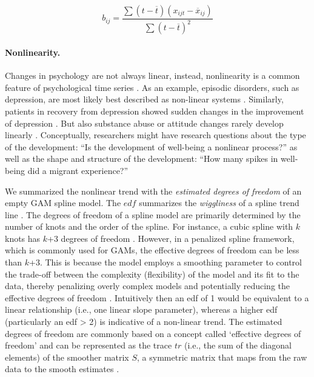 \begin{equation} \label{eq:lin}
  b_{ij} = \frac{\sum(t-\overline{t})(x_{ijt}-\overline{x}_{ij})}{\sum(t-\overline{t})^2}
\end{equation}

\paragraph{Nonlinearity.}

Changes in psychology are not always linear, instead, nonlinearity is a
common feature of psychological time series \citep{hayes2007}. As an
example, episodic disorders, such as depression, are most likely best
described as non-linear systems \citep{hosenfeld2015}. Similarly,
patients in recovery from depression showed sudden changes in the
improvement of depression \citep{helmich2020a}. But also substance abuse
\citep{boker1998} or attitude changes rarely develop linearly
\citep{vandermaas2003}. Conceptually, researchers might have research
questions about the type of the development: ``Is the development of
well-being a nonlinear process?'' as well as the shape and structure of
the development: ``How many spikes in well-being did a migrant
experience?''

We summarized the nonlinear trend with the
\textit{estimated degrees of freedom} of an empty GAM spline model. The
\(edf\) summarizes the \textit{wiggliness} of a spline trend line
\citep{wood2017}. The degrees of freedom of a spline model are primarily
determined by the number of knots and the order of the spline. For
instance, a cubic spline with \(k\) knots has \(k\)+3 degrees of freedom
\citep{faraway2016}. However, in a penalized spline framework, which is
commonly used for GAMs, the effective degrees of freedom can be less
than \(k\)+3. This is because the model employs a smoothing parameter to
control the trade-off between the complexity (flexibility) of the model
and its fit to the data, thereby penalizing overly complex models and
potentially reducing the effective degrees of freedom \citep{marx1998}.
Intuitively then an edf of 1 would be equivalent to a linear
relationship (i.e., one linear slope parameter), whereas a higher edf
(particularly an edf \textgreater{} 2) is indicative of a non-linear
trend. The estimated degrees of freedom are commonly based on a concept
called `effective degrees of freedom' and can be represented as the
trace \(tr\) (i.e., the sum of the diagonal elements) of the smoother
matrix \(S\), a symmetric matrix that maps from the raw data to the
smooth estimates \citep{wood2017}.

